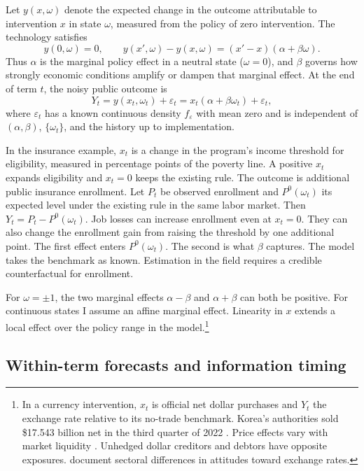 \documentclass[11pt,letterpaper]{article}
\begin{document}
Let $y(x,\omega)$ denote the expected change in the outcome attributable to intervention $x$ in state $\omega$, measured from the policy of zero intervention. The technology satisfies
\[
 y(0,\omega)=0,\qquad
 y(x',\omega)-y(x,\omega)=(x'-x)(\alpha+\beta\omega).
\]
Thus $\alpha$ is the marginal policy effect in a neutral state ($\omega=0$), and $\beta$ governs how strongly economic conditions amplify or dampen that marginal effect. At the end of term $t$, the noisy public outcome is
\begin{equation}
 Y_t=y(x_t,\omega_t)+\varepsilon_t
    =x_t(\alpha+\beta\omega_t)+\varepsilon_t ,
 \label{eq:dgp}
\end{equation}
where $\varepsilon_t$ has a known continuous density $f_\varepsilon$ with mean zero and is independent of $(\alpha,\beta)$, $\{\omega_t\}$, and the history up to implementation.

In the insurance example, $x_t$ is a change in the program's income threshold for eligibility, measured in percentage points of the poverty line. A positive $x_t$ expands eligibility and $x_t=0$ keeps the existing rule. The outcome is additional public insurance enrollment. Let $P_t$ be observed enrollment and $P^0(\omega_t)$ its expected level under the existing rule in the same labor market. Then $Y_t=P_t-P^0(\omega_t)$. Job losses can increase enrollment even at $x_t=0$. They can also change the enrollment gain from raising the threshold by one additional point. The first effect enters $P^0(\omega_t)$. The second is what $\beta$ captures. The model takes the benchmark as known. Estimation in the field requires a credible counterfactual for enrollment.

For $\omega=\pm1$, the two marginal effects $\alpha-\beta$ and $\alpha+\beta$ can both be positive. For continuous states I assume an affine marginal effect. Linearity in $x$ extends a local effect over the policy range in the model.\footnote{In a currency intervention, $x_t$ is official net dollar purchases and $Y_t$ the exchange rate relative to its no-trade benchmark. Korea's authorities sold \$17.543 billion net in the third quarter of 2022 \citep{bokfx}. Price effects vary with market liquidity \citep{filardogm}. Unhedged dollar creditors and debtors have opposite exposures. \citet*{brozfriedenweymouth} document sectoral differences in attitudes toward exchange rates.}

\subsection{Within-term forecasts and information timing}
\end{document}

